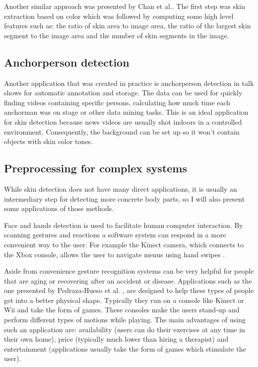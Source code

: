 \documentclass[12pt]{report}
\begin{document}
	Another similar approach was presented by Chan et al.\cite{pornography_filter_with_ratios}. The first step was skin extraction based on color which was followed by computing some high level features such as: the ratio of skin area to image area, the ratio of the largest skin segment to the image area and the number of skin segments in the image.
	
	\subsection{Anchorperson detection}
	Another application that was created in practice is anchorperson detection in talk shows \cite{anchor_person_detection} for automatic annotation and storage. The data can be used for quickly finding videos containing specific persons, calculating how much time each anchorman was on stage or other data mining tasks. This is an ideal application for skin detection because news videos are usually shot indoors in a controlled environment. Consequently, the background can be set up so it won't contain objects with skin color tones.
	
	\subsection{Preprocessing for complex systems}
	While skin detection does not have many direct applications, it is usually an intermediary step for detecting more concrete body parts, so I will also present some applications of those methods.
	
	Face and hands detection is used to facilitate human computer interaction. By scanning gestures and reactions a software system can respond in a more convenient way to the user. For example the Kinect camera, which connects to the Xbox console, allows the user to navigate menus using hand swipes \cite{kinect_control}. 
	
	Aside from convenience gesture recognition systems can be very helpful for people that are aging or recovering after an accident or disease. Applications such as the one presented by Pedraza-Hueso et al. \cite{rehabilitation_kinect}, are designed to help these types of people get into a better physical shape. Typically they run on a console like Kinect or Wii and take the form of games. These consoles make the users stand-up and perform different types of motions while playing. The main advantages of using such an application are: availability (users can do their exercises at any time in their own home), price (typically much lower than hiring a therapist) and entertainment (applications usually take the form of games which stimulate the user).
	
\end{document}

